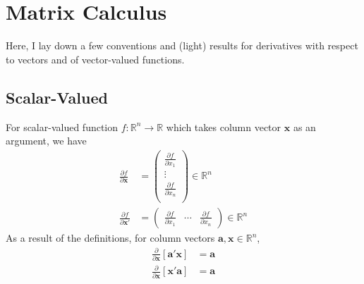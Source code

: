 \documentclass[12pt]{article}
\theoremstyle{plain}
\theoremstyle{definition}
\theoremstyle{remark}
\newcommand{\bsa}{\boldsymbol{a}}
\newcommand{\bsx}{\boldsymbol{x}}
\newcommand{\Rn}{\mathbb{R}^n}
\begin{document}

\clearpage
\appendix

\section{Matrix Calculus}

Here, I lay down a few conventions and (light) results for derivatives
with respect to vectors and of vector-valued functions.

\subsection{Scalar-Valued}

For scalar-valued function $f: \mathbb{R}^n \rightarrow \mathbb{R}$
which takes column vector $\bsx$ as an argument, we have
\begin{align*}
  \frac{\partial f}{\partial \bsx}
  &=
  \begin{pmatrix}
    \frac{\partial f}{\partial x_1} \\
    \vdots\\
    \frac{\partial f}{\partial x_n} \\
    \end{pmatrix} \in \mathbb{R}^n\\
  \frac{\partial f}{\partial \bsx'}
  &=
  \begin{pmatrix}
    \frac{\partial f}{\partial x_1} &
    \cdots&
    \frac{\partial f}{\partial x_n}
  \end{pmatrix}\in \mathbb{R}^n
\end{align*}
As a result of the definitions, for column vectors $\bsa,\bsx\in \Rn$,
\begin{align*}
  \frac{\partial}{\partial \bsx}
  [\bsa'\bsx]
  &= \bsa \\
  \frac{\partial}{\partial \bsx}
  [\bsx'\bsa]
  &= \bsa
\end{align*}
\end{document}
